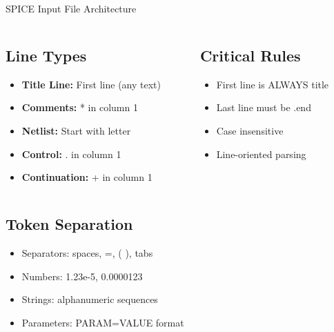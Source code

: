 \documentclass{beamer}
\begin{document}
\begin{frame}{SPICE Input File Architecture}
    \begin{columns}
        \begin{column}{0.5\textwidth}
            \subsection{Line Types}
            \begin{itemize}
                \item \textbf{Title Line:} First line (any text)
                \item \textbf{Comments:} * in column 1
                \item \textbf{Netlist:} Start with letter
                \item \textbf{Control:} . in column 1
                \item \textbf{Continuation:} + in column 1
            \end{itemize}
        \end{column}
        \begin{column}{0.5\textwidth}
            \subsection{Critical Rules}
            \begin{itemize}
                \item First line is ALWAYS title
                \item Last line must be .end
                \item Case insensitive
                \item Line-oriented parsing
            \end{itemize}
        \end{column}
    \end{columns}
    
    \subsection{Token Separation}
    \begin{itemize}
        \item Separators: spaces, =, ( ), tabs
        \item Numbers: 1.23e-5, 0.0000123
        \item Strings: alphanumeric sequences
        \item Parameters: PARAM=VALUE format
    \end{itemize}
\end{frame}
\end{document}
